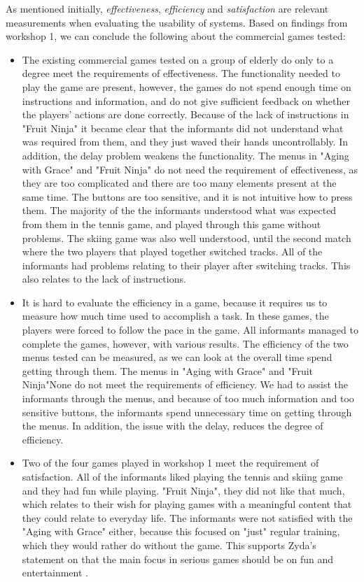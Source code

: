 As mentioned initially, \emph{effectiveness}, \emph{efficiency}  and \emph{satisfaction} are relevant measurements when evaluating the usability of systems. Based on findings from workshop 1, we can conclude the following about the commercial games tested: 
\begin{itemize}
\renewcommand{\labelitemi}{$\bullet$}
\item The existing commercial games tested on a group of elderly do only to a degree meet the requirements of effectiveness. The functionality needed to play the game are present, however, the games do not spend enough time on instructions and information, and do not give sufficient feedback on whether the players' actions are done correctly. Because of the lack of instructions in "Fruit Ninja" it became clear that the informants did not understand what was required from them, and they just waved their hands uncontrollably. In addition, the delay problem weakens the functionality. The menus in "Aging with Grace" and "Fruit Ninja" do not need the requirement of effectiveness, as they are too complicated and there are too many elements present at the same time. The buttons are too sensitive, and it is not intuitive how to press them. The majority of the the informants understood what was expected from them in the tennis game, and played through this game without problems. The skiing game was also well understood, until the second match where the two players that played together switched tracks. All of the informants had problems relating to their player after switching tracks. This also relates to the lack of instructions.
\item It is hard to evaluate the efficiency in a game, because it requires us to measure how much time used to accomplish a task. In these games, the players were forced to follow the pace in the game. All informants managed to complete the games, however, with various results. The efficiency of the two menus tested can be measured, as we can look at the overall time spend getting through them. The menus in "Aging with Grace" and "Fruit Ninja"None do not meet the requirements of efficiency. We had to assist the informants through the menus, and because of too much information and too sensitive buttons, the informants spend unnecessary time on getting through the menus. In addition, the issue with the delay, reduces the degree of efficiency.
\item Two of the four games played in workshop 1 meet the requirement of satisfaction. All of the informants liked playing the tennis and skiing game and they had fun while playing. "Fruit Ninja", they did not like that much, which relates to their wish for playing games with a meaningful content that they could relate to everyday life. The informants were not satisfied with the "Aging with Grace" either, because this focused on "just" regular training, which they would rather do without the game. This supports Zyda's statement on that the main focus in serious games should be on fun and entertainment \cite{zyda2005visual}. 
\end{itemize}

